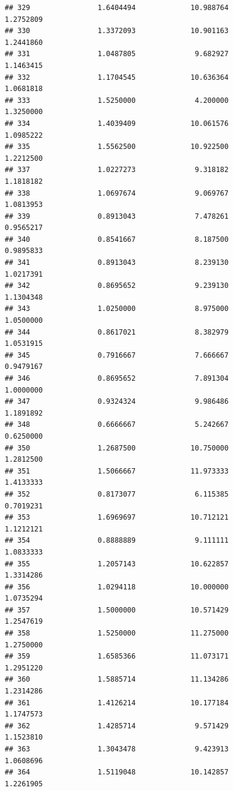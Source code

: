 \documentclass[]{article}
\begin{document}
\begin{verbatim}
## 329                1.6404494             10.988764               1.2752809
## 330                1.3372093             10.901163               1.2441860
## 331                1.0487805              9.682927               1.1463415
## 332                1.1704545             10.636364               1.0681818
## 333                1.5250000              4.200000               1.3250000
## 334                1.4039409             10.061576               1.0985222
## 335                1.5562500             10.922500               1.2212500
## 337                1.0227273              9.318182               1.1818182
## 338                1.0697674              9.069767               1.0813953
## 339                0.8913043              7.478261               0.9565217
## 340                0.8541667              8.187500               0.9895833
## 341                0.8913043              8.239130               1.0217391
## 342                0.8695652              9.239130               1.1304348
## 343                1.0250000              8.975000               1.0500000
## 344                0.8617021              8.382979               1.0531915
## 345                0.7916667              7.666667               0.9479167
## 346                0.8695652              7.891304               1.0000000
## 347                0.9324324              9.986486               1.1891892
## 348                0.6666667              5.242667               0.6250000
## 350                1.2687500             10.750000               1.2812500
## 351                1.5066667             11.973333               1.4133333
## 352                0.8173077              6.115385               0.7019231
## 353                1.6969697             10.712121               1.1212121
## 354                0.8888889              9.111111               1.0833333
## 355                1.2057143             10.622857               1.3314286
## 356                1.0294118             10.000000               1.0735294
## 357                1.5000000             10.571429               1.2547619
## 358                1.5250000             11.275000               1.2750000
## 359                1.6585366             11.073171               1.2951220
## 360                1.5885714             11.134286               1.2314286
## 361                1.4126214             10.177184               1.1747573
## 362                1.4285714              9.571429               1.1523810
## 363                1.3043478              9.423913               1.0608696
## 364                1.5119048             10.142857               1.2261905

\end{verbatim}
\end{document}
